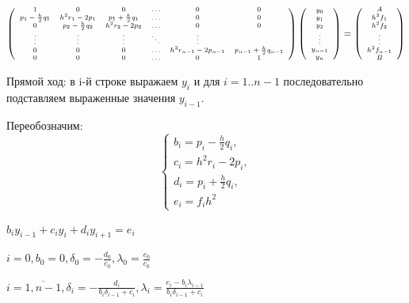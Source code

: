 \documentclass{article}
\begin{document}
		$$
	\scriptsize
	\left(
	\begin{array}{cccccc}
		1 & 0 & 0 & \ldots & 0 & 0\\
		p_1 - \frac{h}{2}q_1 & h^2r_1-2p_1 & p_1 + \frac{h}{2}q_1 & \ldots & 0 & 0\\
		0 & p_2 - \frac{h}{2}q_2 & h^2r_2-2p_2 & \ldots & 0 & 0 \\
		\vdots & \vdots& \vdots & \ddots & \vdots\\
		0 & 0 & 0 & \ldots & h^2r_{n-1}-2p_{n-1} & p_{n-1} + \frac{h}{2}q_{n-1} \\
		0 & 0 & 0 & \ldots & 0 &1
	\end{array}
	\right) 
	\left(\begin{array}{c} 
		y_0\\ 
		y_1\\ 
		y_2\\
		\vdots\\
		y_{n-1}\\
		y_n 
	\end{array}\right)
	=
	\left(\begin{array}{c} 
		A\\ 
		h^2f_1\\ 
		h^2f_2\\
		\vdots\\
		h^2f_{n-1}\\
		B 
	\end{array}\right)
	$$
	
	\hspace{3mm} Прямой ход: в i-й строке выражаем $y_i$ и для $i = 1..n-1$ последовательно подставляем выраженные значения $y_{i-1}$.\par
	Переобозначим:
	\begin{equation*}
		\begin{cases}
			b_i = p_i - \frac{h}{2}q_i,
			\\
			c_i = h^2r_i-2p_i,
			\\
			d_i = p_i + \frac{h}{2}q_i,
			\\
			e_i = f_ih^2
		\end{cases}
	\end{equation*}
	\begin{center}
		$b_iy_{i-1} + c_iy_i + d_iy_{i+1} = e_i$
	\end{center}
	
	
	$i = 0, b_0 = 0, \delta_0 = -\frac{d_0}{c_0}, \lambda_0 = \frac{e_0}{c_0}$
	
	$i = \overline{1, n-1}, \delta_i = -\frac{d_i}{b_i\delta_{i-1}+c_i}, \lambda_i = \frac{e_i-b_i\lambda_{i-1}}{b_i\delta_{i-1}+ c_i}$
	
\end{document}
